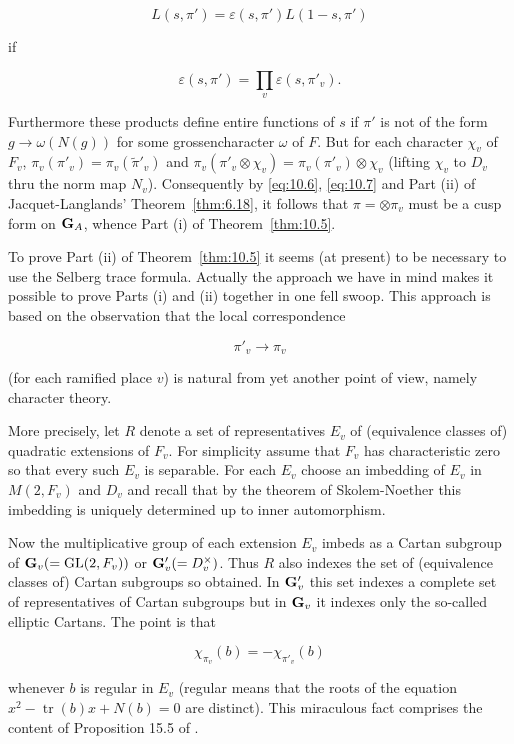 \[
L(s, \pi') = \varepsilon(s, \pi')L(1 - s, \pi')
\]

if

\[
\varepsilon(s, \pi') = \prod_v \varepsilon(s, \pi'_v).
\]

Furthermore these products define entire functions of $s$ if $\pi'$ is not of the form $g \to \omega(N(g))$ for some grossencharacter $\omega$ of $F$. But for each character $\chi_v$ of $F_v$, $\pi_v(\pi'_v) = \pi_v(\tilde{\pi}'_v)$ and $\pi_v(\pi'_v \otimes \chi_v) = \pi_v(\pi'_v) \otimes \chi_v$ (lifting $\chi_v$ to $D_v$ thru the norm map $N_v$). Consequently by \eqref{eq:10.6}, \eqref{eq:10.7} and Part (ii) of Jacquet-Langlands' Theorem~\ref{thm:6.18}, it follows that $\pi = \otimes \pi_v$ must be a cusp form on $\mathbf{G}_A$, whence Part (i) of Theorem~\ref{thm:10.5}.

To prove Part (ii) of Theorem~\ref{thm:10.5} it seems (at present) to be necessary to use the Selberg trace formula. Actually the approach we have in mind makes it possible to prove Parts (i) and (ii) together in one fell swoop. This approach is based on the observation that the local correspondence

\[
\pi'_v \to \pi_v
\]

(for each ramified place $v$) is natural from yet another point of view, namely character theory.

More precisely, let $R$ denote a set of representatives $E_v$ of (equivalence classes of) quadratic extensions of $F_v$. For simplicity assume that $F_v$ has characteristic zero so that every such $E_v$ is separable. For each $E_v$ choose an imbedding of $E_v$ in $M(2, F_v)$ and $D_v$ and recall that by the theorem of Skolem-Noether this imbedding is uniquely determined up to inner automorphism.

Now the multiplicative group of each extension $E_v$ imbeds as a Cartan subgroup of $\mathbf{G}_v (= \operatorname{GL}(2, F_v))$ or $\mathbf{G}'_v (= D_v^{\times})$. Thus $R$ also indexes the set of (equivalence classes of) Cartan subgroups so obtained. In $\mathbf{G}'_v$ this set indexes a complete set of representatives of Cartan subgroups but in $\mathbf{G}_v$ it indexes only the so-called elliptic Cartans. The point is that

\begin{equation}\label{eq:10.8}
\chi_{\pi_v}(b) = -\chi_{\pi'_v}(b)\tag{10.8}
\end{equation}

whenever $b$ is regular in $E_v$ (regular means that the roots of the equation $x^2 - \operatorname{tr}(b)x + N(b) = 0$ are distinct). This miraculous fact comprises the content of Proposition 15.5 of \cite{JacquetLanglands}.

